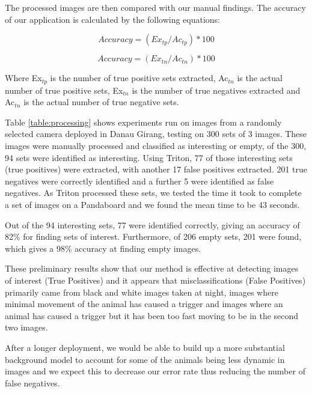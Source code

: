 		The processed images are then compared with our manual findings. The accuracy of our application is calculated by the following equations:
		
		\begin{equation} Accuracy = (Ex_{tp} / Ac_{tp}) * 100 \end{equation} 

		\begin{equation} Accuracy = (Ex_{tn} / Ac_{tn}) * 100 \end{equation}	
		
			Where Ex$_{tp}$  is the number of true positive sets extracted, Ac$_{tn}$  is the actual number of true positive sets, Ex$_{tn}$ is the number of true negatives extracted and Ac$_{tn}$ is the actual number of true negative sets.
		
		Table \ref{table:processing} shows experiments run on images from a randomly selected camera deployed in Danau Girang, testing on 300 sets of 3 images. These images were manually processed and classified as interesting or empty, of the 300, 94 sets were identified as interesting. Using Triton, 77 of those interesting sets (true positives) were extracted, with another 17 false positives extracted. 201 true negatives were correctly identified and a further 5 were identified as false negatives. As Triton processed these sets, we tested the time it took to complete a set of images on a Pandaboard and we found the mean time to be 43 seconds. 
		
		Out of the 94 interesting sets, 77 were identified correctly, giving an accuracy of 82\% for finding sets of interest. Furthermore, of 206 empty sets, 201 were found, which gives a 98\% accuracy at finding empty images.
	
		These preliminary results show that our method is effective at detecting images of interest (True Positives) and it appears that misclassifications (False Positives) primarily came from black and white images taken at night, images where minimal movement of the animal has caused a trigger and images where an animal has caused a trigger but it has been too fast moving to be in the second two images.
		
		After a longer deployment, we would be able to build up a more substantial background model to account for some of the animals being less dynamic in images and we expect this to decrease our error rate thus reducing the number of false negatives. 
		
